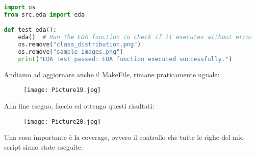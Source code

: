 \documentclass[a4paper,12pt]{article}
\begin{document}
\begin{lstlisting}[language=Python, basicstyle=\ttfamily\footnotesize, breaklines=true, frame=single]
import os
from src.eda import eda

def test_eda():
    eda()  # Run the EDA function to check if it executes without errors
    os.remove("class_distribution.png")
    os.remove("sample_images.png")
    print("EDA test passed: EDA function executed successfully.")
\end{lstlisting}
Andiamo ad aggiornare anche il MakeFile, rimane praticamente uguale:
\begin{figure}[H]
    \centering
    \texttt{[image: Picture19.jpg]}
    \label{etichetta41}
\end{figure}
\noindent Alla fine eseguo, faccio  ed ottengo questi risultati:
\begin{figure}[H]
    \centering
    \texttt{[image: Picture20.jpg]}
    \label{etichetta42}
\end{figure}
\noindent Una cosa importante è la coverage, ovvero il controllo che tutte le righe del mio script siano state eseguite. 
\end{document}
